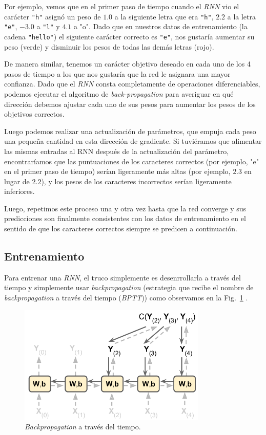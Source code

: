 \documentclass[a4paper,12pt]{article}
\begin{document}
Por ejemplo, vemos que en el primer paso de tiempo cuando el \textit{RNN} vio el carácter \texttt{"h"} asignó un peso de $1.0$ a la siguiente letra que era \texttt{"h"}, $2.2$ a la letra \texttt{"e"}, $-3.0$ a \texttt{"l"} y $4.1$ a "o". Dado que en nuestros datos de entrenamiento (la cadena \texttt{"hello"}) el siguiente carácter correcto es \texttt{"e"}, nos gustaría aumentar su peso (verde) y disminuir los pesos de todas las demás letras (rojo). 

De manera similar, tenemos un carácter objetivo deseado en cada uno de los 4 pasos de tiempo a los que nos gustaría que la red le asignara una mayor confianza. Dado que el \textit{RNN} consta completamente de operaciones diferenciables, podemos ejecutar el algoritmo de \textit{back-propagation} para averiguar en qué dirección debemos ajustar cada uno de sus pesos para aumentar los pesos de los objetivos correctos. 

Luego podemos realizar una actualización de parámetros, que empuja cada peso una pequeña cantidad en esta dirección de gradiente. Si tuviéramos que alimentar las mismas entradas al RNN después de la actualización del parámetro, encontraríamos que las puntuaciones de los caracteres correctos (por ejemplo, "e" en el primer paso de tiempo) serían ligeramente más altas (por ejemplo, $2.3$ en lugar de $2.2$), y los pesos de los caracteres incorrectos serían ligeramente inferiores.

Luego, repetimos este proceso una y otra vez hasta que la red converge y sus predicciones son finalmente consistentes con los datos de entrenamiento en el sentido de que los caracteres correctos siempre se predicen a continuación.

\subsection{Entrenamiento}
Para entrenar una \textit{RNN}, el truco simplemente es desenrrollarla a través del tiempo y simplemente usar \textit{backpropagation} (estrategia que recibe el nombre de \textit{backpropagation} a través del tiempo (\textit{BPTT})) como observamos en la Fig.~\ref{fig:BPTT} \citep{geron}.

\begin{figure}[H]
	\begin{center}				
	\includegraphics[width=0.8\textwidth]{tesis_40.png}
  	\caption{\textit{Backpropagation} a través del tiempo.}
  	\label{fig:BPTT}
  	\end{center}
\end{figure}
\end{document}
